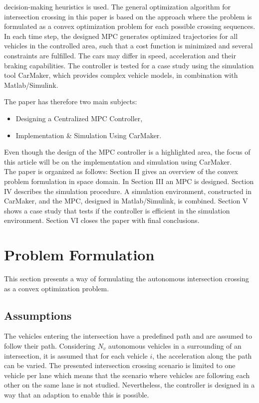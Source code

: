 \documentclass[letterpaper,10pt,conference]{ieeeconf}
\begin{document}
decision-making heuristics is used. The general optimization algorithm for intersection crossing in this paper is based on the approach \cite{nikolce} where the problem is formulated as a convex optimization problem for each possible crossing sequences. In each time step, the designed MPC generates optimized trajectories for all vehicles in the controlled area, such that a cost function is minimized and several constraints are fulfilled. The cars may differ in speed, acceleration and their braking capabilities. The controller is tested for a case study using the simulation tool CarMaker, which provides complex vehicle models, in combination with Matlab/Simulink. 

The paper has therefore two main subjects: 
\begin{itemize}
\setlength\itemsep{0.3em}
\item Designing a Centralized MPC Controller,
\item Implementation \& Simulation Using CarMaker.
\end{itemize}
Even though the design of the MPC controller is a highlighted area, the focus of this article will be on the implementation and simulation using CarMaker.\\ \indent The paper is organized as follows: Section II gives an overview of the convex problem formulation in space domain. In Section III an MPC is designed. Section IV describes the simulation procedure. A simulation environment, constructed in CarMaker, and the MPC, designed in Matlab/Simulink, is combined. Section V shows a case study that tests if the controller is efficient in the simulation environment. Section VI closes the paper with final conclusions.

\section{Problem Formulation} 
This section presents a way of formulating the autonomous intersection crossing as a convex optimization problem. 
\subsection{Assumptions}
The vehicles entering the intersection have a predefined path and are assumed to follow their path. Considering $N_v$ autonomous vehicles in a surrounding of an intersection, it is assumed that for each vehicle $i$, the acceleration along the path can be varied. The presented intersection crossing scenario is limited to one vehicle per lane which means that the scenario where vehicles are following each other on the same lane is not studied. Nevertheless, the controller is designed in a way that an adaption to enable this is possible.
\end{document}

